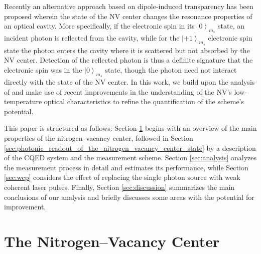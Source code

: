 \documentclass[aps,pra,amsmath,amssymb,reprint,superscriptaddress,tightenlines]{revtex4-1}
\begin{document}
Recently an alternative approach based on dipole-induced transparency has been  proposed \cite{Duan04,Young09,Koshino12,Nemoto14,Sun16} wherein  the state of the NV center changes the resonance properties of an optical cavity. More specifically, if the electronic spin in its $\left|0\right>_{m_{s}}$ state, an incident photon is reflected from the cavity, while for the $\left|+1\right>_{m_{s}}$ electronic spin state the photon enters the cavity where it is scattered but not absorbed by the NV center. Detection of the reflected photon is thus a definite signature that the electronic spin was in the $\left|0\right>_{m_{s}}$ state, though the photon need not interact directly with the state of the NV center. In this work, we build upon the analysis of \cite{Nemoto14} and make use of recent improvements in the understanding of the NV's low-temperature optical characteristics \cite{Goldman15} to refine the quantification of the scheme's potential.

This paper is structured as follows: Section \ref{sec:the_nitrogen_vacancy_center} begins with an overview of the main properties of the nitrogen--vacancy center, followed in Section \ref{sec:photonic_readout_of_the_nitrogen_vacancy_center_state} by a description of the CQED system and the measurement scheme. Section \ref{sec:analysis} analyzes the measurement process in detail and estimates its performance, while Section \ref{sec:wcp} considers the effect of replacing the single photon source with weak coherent laser pulses. Finally, Section \ref{sec:discussion} summarizes the main conclusions of our analysis and briefly discusses some areas with the potential for improvement.



\section{The Nitrogen--Vacancy Center}  \label{sec:the_nitrogen_vacancy_center}
\end{document}
